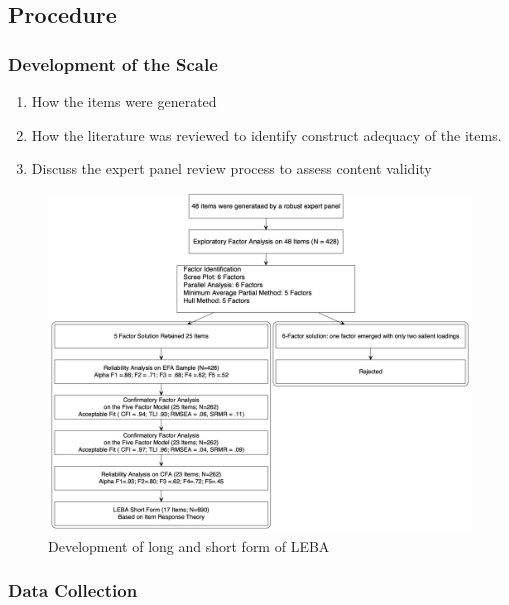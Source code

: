 \documentclass[
  english,
  man]{apa6}
\providecommand{\tightlist}{%
  \setlength{\itemsep}{0pt}\setlength{\parskip}{0pt}}
\begin{document}
\hypertarget{procedure}{%
\subsection{Procedure}\label{procedure}}

\hypertarget{development-of-the-scale}{%
\subsubsection{Development of the Scale}\label{development-of-the-scale}}

\begin{enumerate}
\def\labelenumi{\arabic{enumi}.}
\tightlist
\item
  How the items were generated
\item
  How the literature was reviewed to identify construct adequacy of the items.
\item
  Discuss the expert panel review process to assess content validity
\end{enumerate}

\begin{figure}

{\centering \includegraphics[width=1\linewidth,height=1.5\textheight]{Manuscript.figures/Flowchart1} 

}

\caption{Development of long and short form of LEBA}\label{fig:FlowchartFig}
\end{figure}

\hypertarget{data-collection}{%
\subsubsection{Data Collection}\label{data-collection}}
\end{document}
